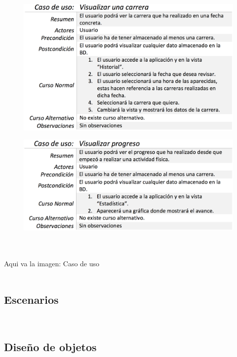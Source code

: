\documentclass[a4paper, 11pt]{article}
\begin{document}
\begin{itemize}
            \begin{figure}[H]
              \centering
              \includegraphics[width=1\textwidth]{visualizar-una-carrera}
            \end{figure}

            \begin{figure}[H]
              \centering
              \includegraphics[width=1\textwidth]{visualizar-progreso}
            \end{figure}

          \\\\\textcolor[rgb]{1,0,0}{Aqui va la imagen: Caso de uso}\\\\

       \subsection{Escenarios}\\

       \subsection{Diseño de objetos}\\


\end{itemize}
\end{document}
